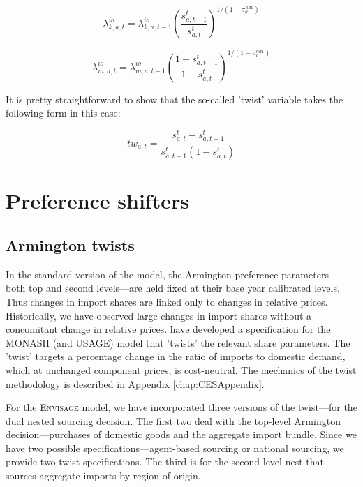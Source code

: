\documentclass[11pt,letterpaper]{report}
\begin{document}
\begin{equation}
\label{eq:ios}
\lambda^{\mathit{io}}_{k,a,t} = \lambda^{\mathit{io}}_{k,a,t-1}
\left(\frac{s^t_{a,t-1}}{s^t_{a,t}}
\right)^{1/(1-\sigma^{\mathit{nd1}}_{a})}
\end{equation}

\begin{equation}
\label{eq:iom}
\lambda^{\mathit{io}}_{m,a,t} = \lambda^{\mathit{io}}_{m,a,t-1}
\left(\frac{1 - s^t_{a,t-1}}{1 - s^t_{a,t}}
\right)^{1/(1-\sigma^{\mathit{nd1}}_{a})}
\end{equation}

It is pretty straightforward to show that the so-called 'twist' variable
takes the following form in this case:

\[
\mathit{tw}_{a,t} = \frac{s^t_{a,t} - s^t_{a,t-1}}{s^t_{a,t-1}\left(1 - s^t_{a,t}\right)}
\]

\section{Preference shifters}

\subsection{Armington twists}

In the standard version of the model, the Armington preference parameters---both
top and second levels---are held fixed at their base year calibrated levels.
Thus changes in import shares are linked only to changes in relative prices.
Historically, we have observed large changes in import shares without a
concomitant change in relative prices. \cite{DixonRimmer2002} have developed a
specification for the MONASH (and USAGE) model that 'twists' the relevant share
parameters. The 'twist' targets a percentage change in the ratio of imports to
domestic demand, which at unchanged component prices, is cost-neutral. The
mechanics of the twist methodology is described in
Appendix \ref{chap:CESAppendix}.

For the \textsc{Envisage} model, we have incorporated three versions of the
twist---for the dual nested sourcing decision. The first two deal with the
top-level Armington decision---purchases of domestic goods and the aggregate
import bundle. Since we have two possible specifications---agent-based sourcing
or national sourcing, we provide two twist specifications. The third is for the
second level nest that sources aggregate imports by region of origin.
\end{document}
